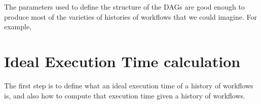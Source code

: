 The parameters used to define the structure of the DAGs are good enough to produce most of the varieties of histories of workflows that we could imagine. For example, 
\section{Ideal Execution Time calculation}
The first step is to define what an ideal execution time of a history of workflows is, and also how to compute that execution time given a history of workflows.